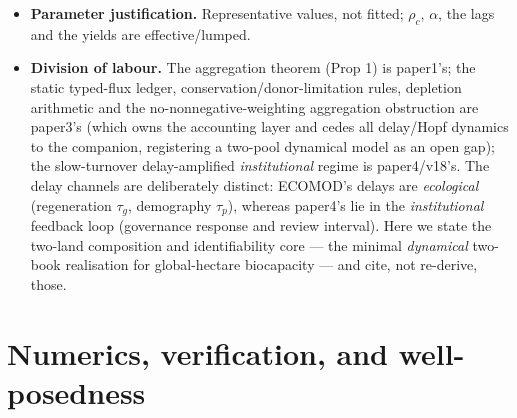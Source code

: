 \documentclass[11pt]{article}
\begin{document}
\begin{itemize}
\item \textbf{Parameter justification.} Representative values, not fitted; $\rho_c$, $\alpha$, the lags and the yields are effective/lumped.
\item \textbf{Division of labour.} The aggregation theorem (Prop 1) is paper1's; the static typed-flux ledger, conservation/donor-limitation rules, depletion arithmetic and the no-nonnegative-weighting aggregation obstruction are paper3's (which owns the accounting layer and cedes all delay/Hopf dynamics to the companion, registering a two-pool dynamical model as an open gap); the slow-turnover delay-amplified \emph{institutional} regime is paper4/v18's. The delay channels are deliberately distinct: ECOMOD's delays are \emph{ecological} (regeneration $\tau_g$, demography $\tau_p$), whereas paper4's lie in the \emph{institutional} feedback loop (governance response and review interval). Here we state the two-land composition and identifiability core --- the minimal \emph{dynamical} two-book realisation for global-hectare biocapacity --- and cite, not re-derive, those.
\end{itemize}

\section{Numerics, verification, and well-posedness}
\end{document}
